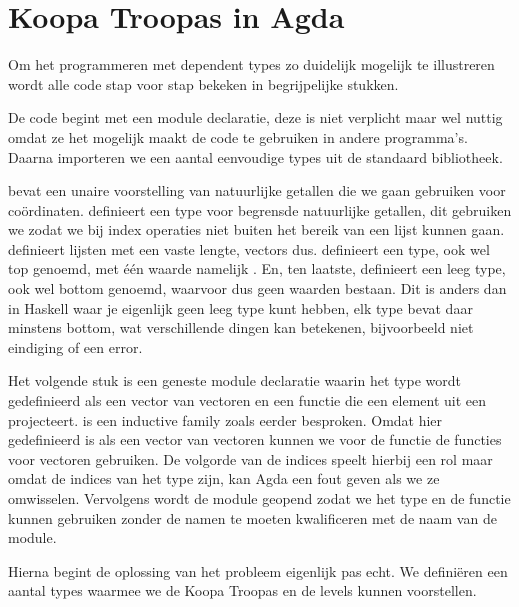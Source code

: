 \section{Koopa Troopas in Agda}

Om het programmeren met dependent types zo duidelijk mogelijk te illustreren
wordt alle code stap voor stap bekeken in begrijpelijke stukken.  

De code begint met een module declaratie, deze is niet verplicht maar wel
nuttig omdat ze het mogelijk maakt de code te gebruiken in andere programma's.
Daarna importeren we een aantal eenvoudige types uit de standaard bibliotheek.


 bevat een unaire voorstelling van natuurlijke getallen die we
gaan gebruiken voor coördinaten.  definieert een type voor
begrensde natuurlijke getallen, dit gebruiken we zodat we bij index operaties
niet buiten het bereik van een lijst kunnen gaan.  definieert
lijsten met een vaste lengte, vectors dus.  definieert een
type,  ook wel top genoemd, met één waarde namelijk . En,
ten laatste,  definieert een leeg type,  ook wel
bottom genoemd, waarvoor dus geen waarden bestaan. Dit is anders dan in Haskell
waar je eigenlijk geen leeg type kunt hebben, elk type bevat daar minstens
bottom, wat verschillende dingen kan betekenen, bijvoorbeeld niet eindiging of
een error.

Het volgende stuk is een geneste module declaratie waarin het type
 wordt gedefinieerd als een vector van vectoren en een functie
die een element uit een  projecteert.  is een
inductive family zoals eerder besproken. Omdat  hier gedefinieerd
is als een vector van vectoren kunnen we voor de  functie de
 functies voor vectoren gebruiken. De volgorde van de indices
speelt hierbij een rol maar omdat de indices van het type 
zijn, kan Agda een fout geven als we ze omwisselen. Vervolgens wordt de module
geopend zodat we het type en de functie kunnen gebruiken zonder de namen te
moeten kwalificeren met de naam van de module.


Hierna begint de oplossing van het probleem eigenlijk pas echt. We definiëren
een aantal types waarmee we de Koopa Troopas en de levels kunnen voorstellen.

